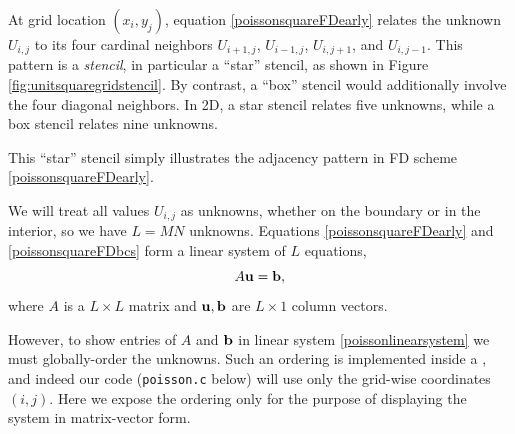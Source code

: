 At grid location $(x_i,y_j)$, equation \eqref{poissonsquareFDearly} relates the unknown $U_{i,j}$ to its four cardinal neighbors $U_{i+1,j}$, $U_{i-1,j}$, $U_{i,j+1}$, and $U_{i,j-1}$.  This pattern is a \emph{stencil}, in particular a ``star'' stencil, as shown in Figure \ref{fig:unitsquaregridstencil}.  By contrast, a ``box'' stencil would additionally involve the four diagonal neighbors.  In 2D, a star stencil relates five unknowns, while a box stencil relates nine unknowns.

\begin{marginfigure}
\caption{This ``star'' stencil simply illustrates the adjacency pattern in FD scheme \eqref{poissonsquareFDearly}.}
\label{fig:unitsquaregridstencil}
\end{marginfigure}

We will treat all values $U_{i,j}$ as unknowns, whether on the boundary or in the interior, so we have $L=MN$ unknowns.  Equations \eqref{poissonsquareFDearly} and \eqref{poissonsquareFDbcs} form a linear system of $L$ equations,
\begin{equation}
A \mathbf{u} = \mathbf{b}, \label{poissonlinearsystem}
\end{equation}
where $A$ is a $L\times L$ matrix and $\mathbf{u},\mathbf{b}$ are $L\times 1$ column vectors.

However, to show entries of $A$ and $\mathbf{b}$ in linear system \eqref{poissonlinearsystem} we must globally-order the unknowns.  Such an ordering is implemented inside a \PETSc \pDMDA, and indeed our code (\texttt{poisson.c} below) will use only the grid-wise coordinates $(i,j)$.  Here we expose the ordering only for the purpose of displaying the system in matrix-vector form.

